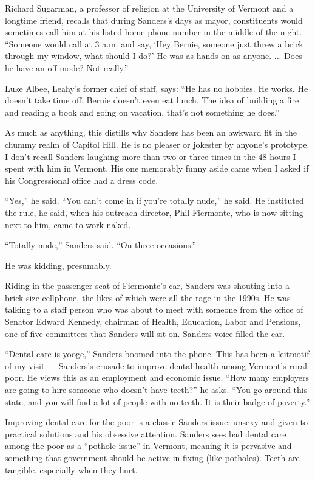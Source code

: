 Richard Sugarman, a professor of religion at the University of Vermont
and a longtime friend, recalls that during Sanders's days as mayor,
constituents would sometimes call him at his listed home phone number in
the middle of the night. ``Someone would call at 3 a.m. and say, `Hey
Bernie, someone just threw a brick through my window, what should I do?'
He was as hands on as anyone. ... Does he have an off-mode? Not
really.''

Luke Albee, Leahy's former chief of staff, says: ``He has no hobbies. He
works. He doesn't take time off. Bernie doesn't even eat lunch. The idea
of building a fire and reading a book and going on vacation, that's not
something he does.''

As much as anything, this distills why Sanders has been an awkward fit
in the chummy realm of Capitol Hill. He is no pleaser or jokester by
anyone's prototype. I don't recall Sanders laughing more than two or
three times in the 48 hours I spent with him in Vermont. His one
memorably funny aside came when I asked if his Congressional office had
a dress code.

``Yes,'' he said. ``You can't come in if you're totally nude,'' he said.
He instituted the rule, he said, when his outreach director, Phil
Fiermonte, who is now sitting next to him, came to work naked.

``Totally nude,'' Sanders said. ``On three occasions.''

He was kidding, presumably.

Riding in the passenger seat of Fiermonte's car, Sanders was shouting
into a brick-size cellphone, the likes of which were all the rage in the
1990s. He was talking to a staff person who was about to meet with
someone from the office of Senator Edward Kennedy, chairman of Health,
Education, Labor and Pensions, one of five committees that Sanders will
sit on. Sanders voice filled the car.

``Dental care is yooge,'' Sanders boomed into the phone. This has been a
leitmotif of my visit --- Sanders's crusade to improve dental health
among Vermont's rural poor. He views this as an employment and economic
issue. ``How many employers are going to hire someone who doesn't have
teeth?'' he asks. ``You go around this state, and you will find a lot of
people with no teeth. It is their badge of poverty.''

Improving dental care for the poor is a classic Sanders issue: unsexy
and given to practical solutions and his obsessive attention. Sanders
sees bad dental care among the poor as a ``pothole issue'' in Vermont,
meaning it is pervasive and something that government should be active
in fixing (like potholes). Teeth are tangible, especially when they
hurt.

